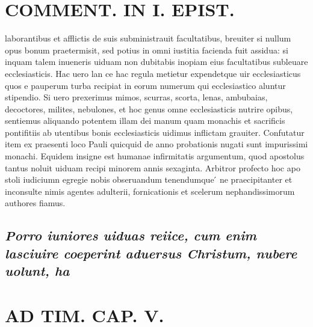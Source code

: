 \documentclass{article}
\begin{document}
\begin{pages}
\section*{COMMENT. IN I. EPIST. }\pstart laborantibus et afflictis de suis subministrauit facultatibus, breuiter si nullum opus bonum praetermisit, sed potius in omni iustitia facienda fuit assidua: si inquam talem inueneris uiduam non dubitabis inopiam eius facultatibus subleuare ecclesiasticis. Hac uero lan ce hac regula metietur expendetque uir ecclesiasticus quos e pauperum turba recipiat in eorum numerum qui ecclesiastico aluntur stipendio. Si uero prexerimus mimos, scurras, scorta, lenas, ambubaias, decoctores, milites, nebulones, et hoc genus omne ecclesiasticis nutrire opibus, sentiemus aliquando potentem illam dei manum quam monachis et sacrificis pontifitiis ab utentibus bonis ecclesiasticis uidimus inflictam grauiter. Confutatur item ex praesenti loco Pauli quicquid de anno probationis nugati sunt impurissimi monachi. Equidem insigne est humanae infirmitatis argumentum, quod apostolus tantus noluit uiduam recipi minorem annis sexaginta. Arbitror profecto hoc apo stoli iudiciumn egregie nobis obseruandum tenendumque ́ ne praecipitanter et inconsulte nimis agentes adulterii, fornicationis et scelerum nephandissimorum authores fiamus.  \pend
{}
{}
\subsection*{\textit{Porro iuniores uiduas reiice, cum enim lasciuire coeperint aduersus Christum, nubere uolunt, ha}}
\section*{AD TIM. CAP. V. }
\marginpar{[ p.153 ]}
{}

\end{pages}
\end{document}
